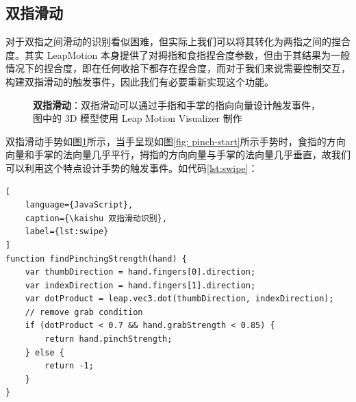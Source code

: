\subsection{双指滑动}

对于双指之间滑动的识别看似困难，但实际上我们可以将其转化为两指之间的捏合度。其实 LeapMotion 本身提供了对拇指和食指捏合度参数，但由于其结果为一般情况下的捏合度，即在任何收拾下都存在捏合度，而对于我们来说需要控制交互，构建双指滑动的触发事件，因此我们有必要重新实现这个功能。

\begin{figure}[H]
\kaishu
\centering
{}
\caption{\textbf{双指滑动}：双指滑动可以通过手指和手掌的指向向量设计触发事件，图中的 3D 模型使用 Leap Motion Visualizer 制作}
\label{fig:pinch}
\end{figure}

双指滑动手势如图\ref{fig:pinch}所示，当手呈现如图\ref{fig: pinch-start}所示手势时，食指的方向向量和手掌的法向量几乎平行，拇指的方向向量与手掌的法向量几乎垂直，故我们可以利用这个特点设计手势的触发事件。如代码\ref{lst:swipe}：

\begin{lstlisting}[
    language={JavaScript},
    caption={\kaishu 双指滑动识别},
    label={lst:swipe}
]
function findPinchingStrength(hand) {
    var thumbDirection = hand.fingers[0].direction;
    var indexDirection = hand.fingers[1].direction;
    var dotProduct = leap.vec3.dot(thumbDirection, indexDirection);
    // remove grab condition
    if (dotProduct < 0.7 && hand.grabStrength < 0.85) {
        return hand.pinchStrength;
    } else {
        return -1;
    }
}
\end{lstlisting}

